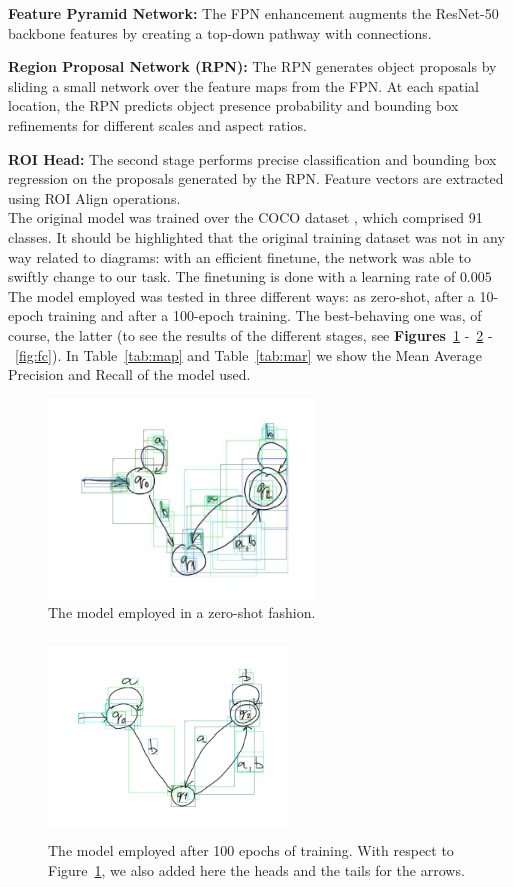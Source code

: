 \documentclass[conference]{IEEEtran}
\begin{document}
\textbf{Feature Pyramid Network:} The FPN enhancement augments the ResNet-50 backbone features by creating a top-down pathway with connections.

\textbf{Region Proposal Network (RPN):} The RPN generates object proposals by sliding a small network over the feature maps from the FPN. At each spatial location, the RPN predicts object presence probability and bounding box refinements for different scales and aspect ratios.

\textbf{ROI Head:} The second stage performs precise classification and bounding box regression on the proposals generated by the RPN. Feature vectors are extracted using ROI Align operations. \\

The original model was trained over the COCO dataset \cite{coco}, which comprised 91 classes. It should be highlighted that the original training dataset was not in any way related to diagrams: with an efficient finetune, the network was able to swiftly change to our task. The finetuning is done with a learning rate of $0.005$ \\

The model employed was tested in three different ways: as zero-shot, after a 10-epoch training and after a 100-epoch training. The best-behaving one was, of course, the latter (to see the results of the different stages, see \textbf{Figures}~\ref{fig:bbox1} -~\ref{fig:bbox3} -~\ref{fig:fc}). In Table~\ref{tab:map} and Table~\ref{tab:mar} we show the Mean Average Precision and Recall of the model used.

\begin{figure}[H]
	\centering
	\includegraphics[width=200pt, height=150pt]{bbox1.jpg}
	\caption{The model employed in a zero-shot fashion.}
	\label{fig:bbox1}
\end{figure}

\begin{figure}[H]
	\centering
	\includegraphics[width=180pt, height=150pt]{bbox3.png}
	\caption{The model employed after 100 epochs of training. With respect to Figure~\ref{fig:bbox1}, we also added here the heads and the tails for the arrows.}
	\label{fig:bbox3}
\end{figure}
\end{document}
